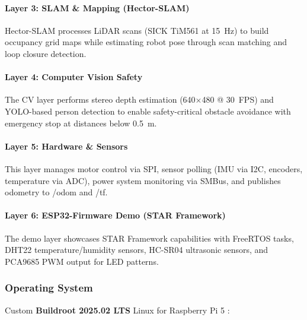 \paragraph{Layer 3: SLAM \& Mapping (Hector-SLAM)}

Hector-SLAM processes LiDAR scans (SICK TiM561 at 15~Hz) to build occupancy grid maps while estimating robot pose through scan matching and loop closure detection.



\paragraph{Layer 4: Computer Vision Safety}

The CV layer performs stereo depth estimation (640$\times$480 @ 30~FPS) and YOLO-based person detection to enable safety-critical obstacle avoidance with emergency stop at distances below 0.5~m.



\paragraph{Layer 5: Hardware \& Sensors}

This layer manages motor control via SPI, sensor polling (IMU via I2C, encoders, temperature via ADC), power system monitoring via SMBus, and publishes odometry to /odom and /tf.



\paragraph{Layer 6: ESP32-Firmware Demo (STAR Framework)}

The demo layer showcases STAR Framework capabilities with FreeRTOS tasks, DHT22 temperature/humidity sensors, HC-SR04 ultrasonic sensors, and PCA9685 PWM output for LED patterns.



\subsubsection{Operating System}

Custom \textbf{Buildroot 2025.02 LTS} Linux for Raspberry Pi 5 \parencite{buildroot}:

